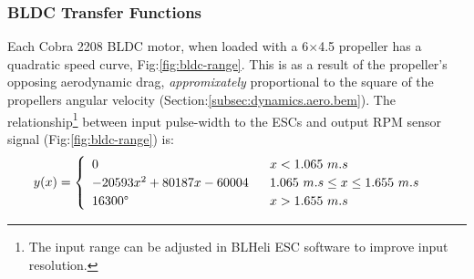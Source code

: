 \subsubsection*{BLDC Transfer Functions}
Each Cobra 2208 BLDC motor, when loaded with a 6$\times$4.5 propeller has a quadratic speed curve, Fig:\ref{fig:bldc-range}. This is as a result of the propeller's opposing aerodynamic drag, \emph{appromixately} proportional to the square of the propellers angular velocity (Section:\ref{subsec:dynamics.aero.bem}). The relationship\footnote{The input range can be adjusted in BLHeli ESC software to improve input resolution.} between input pulse-width to the ESCs and output RPM sensor signal (Fig:\ref{fig:bldc-range}) is:
\begin{equation}
y(x)=
\begin{cases}\begin{array}{ll}
0 & ~~x<1.065~m.s\\
-20593x^2 + 80187x - 60004 & ~~1.065~m.s \leq x \leq 1.655~m.s\\
16300\text{\textdegree} & ~~x>1.655~m.s\\
\end{array}
\end{cases}
\label{eq:bldc-range}
\end{equation}
\par
